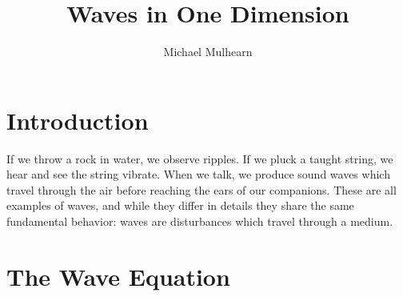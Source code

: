 \documentclass[12pt]{article}
\begin{document}
\newcommand{\pt}           {\ensuremath{ p_{\rm T} }}
\newcommand{\Et}           {\ensuremath{ E_{\rm t}     }}

\let\divsymb=\div %
\newcommand{\gv}[1]{\ensuremath{\mbox{\boldmath$ #1 $}}} 
\newcommand{\grad}[1]{\gv{\nabla} #1} %
\renewcommand{\div}[1]{\gv{\nabla} \cdot #1} %


\newcommand{\abs}[1]{\left| #1 \right|} %
\newcommand{\avg}[1]{\left< #1 \right>} %




\let\underdot=\d %
\renewcommand{\d}[2]{\frac{d #1}{d #2}} %
\newcommand{\dd}[2]{\frac{d^2 #1}{d #2^2}} %
\newcommand{\pd}[2]{\frac{\partial #1}{\partial #2}} %
\newcommand{\pdd}[2]{\frac{\partial^2 #1}{\partial #2^2}} %
\newcommand{\pdc}[3]{\left( \frac{\partial #1}{\partial #2} \right)_{#3}} %

\newcommand{\planewave}{e^{\textstyle i\vec{k} \cdot \vec{x}}}
\newcommand{\radialwave}{\frac{1}{r} \, e^{\textstyle ikr}} 

\title{Waves in One Dimension}
\author{Michael Mulhearn}

\maketitle

\section{Introduction}

If we throw a rock in water, we observe ripples.  If we pluck a taught
string, we hear and see the string vibrate.  When we talk, we produce
sound waves which travel through the air before reaching the ears of
our companions. These are all examples of waves, and while they differ
in details they share the same fundamental behavior: waves are
disturbances which travel through a medium.

\section{The Wave Equation}
\end{document}
